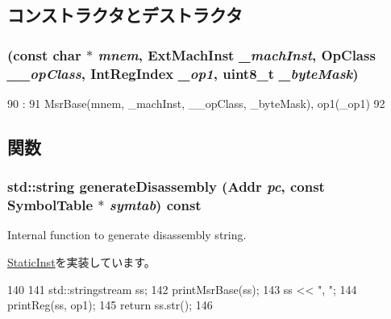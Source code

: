 \subsection{コンストラクタとデストラクタ}
\hypertarget{classMsrRegOp_a6f67414a0b4d76e9793c7714cccd9890}{
\subsubsection[{MsrRegOp}]{ (const char $\ast$ {\em mnem}, \/  {\bf ExtMachInst} {\em \_\-machInst}, \/  OpClass {\em \_\-\_\-opClass}, \/  {\bf IntRegIndex} {\em \_\-op1}, \/  uint8\_\-t {\em \_\-byteMask})}}
\label{classMsrRegOp_a6f67414a0b4d76e9793c7714cccd9890}



\begin{DoxyCode}
90                                                   :
91         MsrBase(mnem, _machInst, __opClass, _byteMask), op1(_op1)
92     {}

\end{DoxyCode}


\subsection{関数}
\hypertarget{classMsrRegOp_a95d323a22a5f07e14d6b4c9385a91896}{
\subsubsection[{generateDisassembly}]{\setlength{\rightskip}{0pt plus 5cm}std::string generateDisassembly ({\bf Addr} {\em pc}, \/  const SymbolTable $\ast$ {\em symtab}) const}}
\label{classMsrRegOp_a95d323a22a5f07e14d6b4c9385a91896}
Internal function to generate disassembly string. 

\hyperlink{classStaticInst_ab4a569d2623620c04f8a52bbd91d63b9}{StaticInst}を実装しています。


\begin{DoxyCode}
140 {
141     std::stringstream ss;
142     printMsrBase(ss);
143     ss << ", ";
144     printReg(ss, op1);
145     return ss.str();
146 }
\end{DoxyCode}


